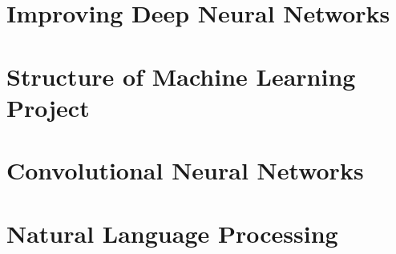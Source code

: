 \documentclass[11pt]{report}
\begin{document}
\chapter{Improving Deep Neural Networks}

\chapter{Structure of Machine Learning Project}

\chapter{Convolutional Neural Networks}

\chapter{Natural Language Processing}


\end{document}
